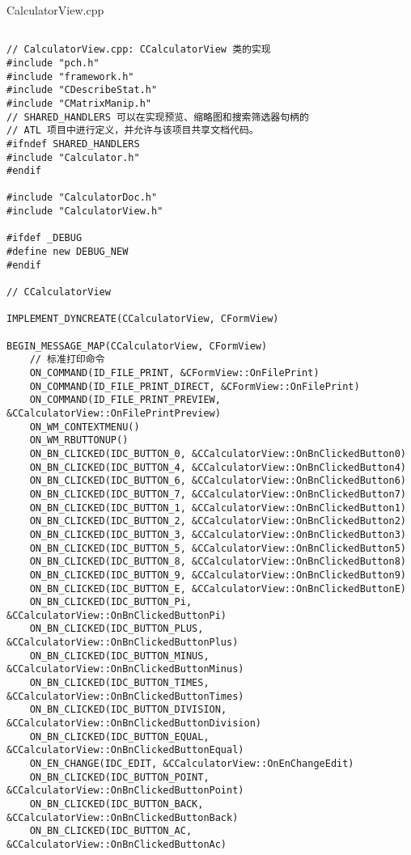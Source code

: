 CalculatorView.cpp
\begin{lstlisting}

// CalculatorView.cpp: CCalculatorView 类的实现
#include "pch.h"
#include "framework.h"
#include "CDescribeStat.h"
#include "CMatrixManip.h"
// SHARED_HANDLERS 可以在实现预览、缩略图和搜索筛选器句柄的
// ATL 项目中进行定义，并允许与该项目共享文档代码。
#ifndef SHARED_HANDLERS
#include "Calculator.h"
#endif

#include "CalculatorDoc.h"
#include "CalculatorView.h"

#ifdef _DEBUG
#define new DEBUG_NEW
#endif

// CCalculatorView

IMPLEMENT_DYNCREATE(CCalculatorView, CFormView)

BEGIN_MESSAGE_MAP(CCalculatorView, CFormView)
    // 标准打印命令
    ON_COMMAND(ID_FILE_PRINT, &CFormView::OnFilePrint)
    ON_COMMAND(ID_FILE_PRINT_DIRECT, &CFormView::OnFilePrint)
    ON_COMMAND(ID_FILE_PRINT_PREVIEW, &CCalculatorView::OnFilePrintPreview)
    ON_WM_CONTEXTMENU()
    ON_WM_RBUTTONUP()
    ON_BN_CLICKED(IDC_BUTTON_0, &CCalculatorView::OnBnClickedButton0)
    ON_BN_CLICKED(IDC_BUTTON_4, &CCalculatorView::OnBnClickedButton4)
    ON_BN_CLICKED(IDC_BUTTON_6, &CCalculatorView::OnBnClickedButton6)
    ON_BN_CLICKED(IDC_BUTTON_7, &CCalculatorView::OnBnClickedButton7)
    ON_BN_CLICKED(IDC_BUTTON_1, &CCalculatorView::OnBnClickedButton1)
    ON_BN_CLICKED(IDC_BUTTON_2, &CCalculatorView::OnBnClickedButton2)
    ON_BN_CLICKED(IDC_BUTTON_3, &CCalculatorView::OnBnClickedButton3)
    ON_BN_CLICKED(IDC_BUTTON_5, &CCalculatorView::OnBnClickedButton5)
    ON_BN_CLICKED(IDC_BUTTON_8, &CCalculatorView::OnBnClickedButton8)
    ON_BN_CLICKED(IDC_BUTTON_9, &CCalculatorView::OnBnClickedButton9)
    ON_BN_CLICKED(IDC_BUTTON_E, &CCalculatorView::OnBnClickedButtonE)
    ON_BN_CLICKED(IDC_BUTTON_Pi, &CCalculatorView::OnBnClickedButtonPi)
    ON_BN_CLICKED(IDC_BUTTON_PLUS, &CCalculatorView::OnBnClickedButtonPlus)
    ON_BN_CLICKED(IDC_BUTTON_MINUS, &CCalculatorView::OnBnClickedButtonMinus)
    ON_BN_CLICKED(IDC_BUTTON_TIMES, &CCalculatorView::OnBnClickedButtonTimes)
    ON_BN_CLICKED(IDC_BUTTON_DIVISION, &CCalculatorView::OnBnClickedButtonDivision)
    ON_BN_CLICKED(IDC_BUTTON_EQUAL, &CCalculatorView::OnBnClickedButtonEqual)
    ON_EN_CHANGE(IDC_EDIT, &CCalculatorView::OnEnChangeEdit)
    ON_BN_CLICKED(IDC_BUTTON_POINT, &CCalculatorView::OnBnClickedButtonPoint)
    ON_BN_CLICKED(IDC_BUTTON_BACK, &CCalculatorView::OnBnClickedButtonBack)
    ON_BN_CLICKED(IDC_BUTTON_AC, &CCalculatorView::OnBnClickedButtonAc)

\end{lstlisting}
